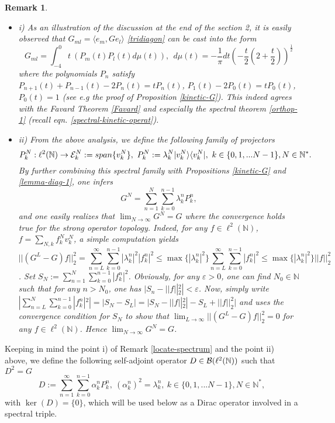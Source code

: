 \documentclass[a4paper,11pt,twoside]{article}
\numberwithin{equation}{section}
\newtheorem{remark}[Theorem]{Remark}
\theoremstyle{nonumberplain}
\begin{document}
\begin{remark}\label{remark-dirac} \ \\[-20pt]
\begin{itemize}
\setlength{\itemsep}{-1pt}
\item i) As an illustration of the discussion at the end of the section 2, it is easily observed that $G_{ml}=\langle e_m,Ge_l \rangle $ \eqref{tridiagon} can be cast into the form 
\begin{equation}
G_{ml}=\int_{-4}^0t\ (P_m(t)P_l(t)d\mu(t)),\ \ d\mu(t)=-\frac{1}{\pi}dt(-\frac{t}{2}(2+\frac{t}{2}))^{\frac{1}{2}}\label{spectral-kineticterm}
\end{equation}
where the polynomials $P_n$ satisfy $P_{n+1}(t)+P_{n-1}(t)-2P_n(t)=tP_n(t)$, $P_1(t)-2P_0(t)=tP_0(t)$, $P_0(t)=1$ (see e.g the proof of Proposition \ref{kinetic-G}). This indeed agrees with the Favard Theorem \ref{Favard} and especially the spectral theorem \ref{orthop-1} (recall eqn. \eqref{spectral-kinetic-operat}).
\item ii) From the above analysis, we define the following family of projectors
\begin{equation}
P^N_k:\ell^2(\mathbb{N})\to {\cal{E}}^N_k:=span\{v^N_k\},\ P^N_k:=\lambda^N_k| v^N_k\rangle\langle v^N_k |,\ k\in\{0,1,...N-1 \}, N\in\mathbb{N}^*\label{proj-simple}.
\end{equation}
By further combining this spectral family with Propositions \ref{kinetic-G} and \ref{lemma-diag-1}, one infers
\begin{equation}
G^N=\sum_{n=1}^N\sum_{k=0}^{n-1}\lambda^n_kP^n_k\label{gn-projector},
\end{equation}
and one easily realizes that $\lim_{N\to\infty}G^N=G$ where the convergence holds true for the strong operator topology. Indeed, for any $f\in\ell^2(\mathbb{N})$, $f=\sum_{N,k}f^N_kv^N_k$, a simple computation yields $$||(G^L-G)f ||^2_2=\sum_{n=L}^\infty\sum_{k=0}^{n-1}|\lambda^n_k|^2|f^n_k|^2\le\max\{|\lambda^n_k|^2 \}\sum_{n=L}^\infty\sum_{k=0}^{n-1}|f^n_k|^2\le \max\{|\lambda^n_k|^2 \}||f||_2^2$$. 
\noindent Set $S_N:=\sum_{n=1}^N\sum_{k=0}^{n-1}|f^n_k|^2$. Obviously, for any $\varepsilon>0$, one can find $N_0\in\mathbb{N}$ such that for any $n>N_0$, one has $|S_n-||f||^2_2|<\varepsilon$. Now, simply write $|\sum_{n=L}^N\sum_{k=0}^{n-1}|f^n_k|^2|=|S_N-S_L|=|S_N-||f||^2_2|-S_L+||f||^2_2|$ and uses the convergence condition for $S_N$ to show that $\lim_{L\to\infty}||(G^L-G)f ||^2_2=0$ for any $f\in\ell^2(\mathbb{N})$. Hence $\lim_{N\to\infty}G^N=G$.
\end{itemize}
\end{remark}
Keeping in mind the point i) of Remark \ref{locate-spectrum} and the point ii) above, we define the following self-adjoint operator $D\in{\cal{B}}(\ell^2(\mathbb{N}))$ such that $D^2=G$
\begin{equation}
D:=\sum_{n=1}^\infty\sum_{k=0}^{n-1}\alpha^n_kP^n_k, \ (\alpha^n_k)^2=\lambda^n_k,\ k\in\{0,1,...N-1 \}, N\in\mathbb{N}^*\label{Dirac-simple},
\end{equation}
with $\ker(D)=\{0 \}$, which will be used below as a Dirac operator involved in a spectral triple.
\end{document}
